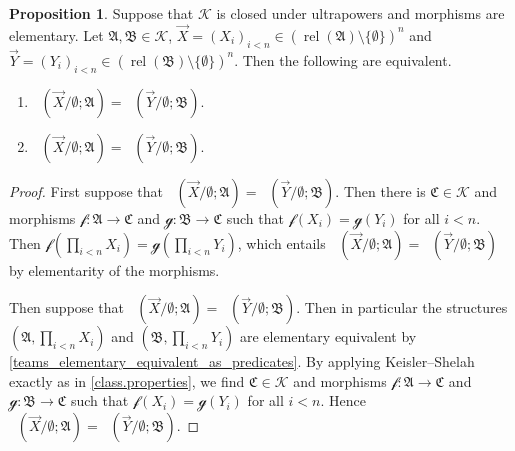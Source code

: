\documentclass[a4paper]{amsart}
\theoremstyle{definition}
\newtheorem{proposition}[definition]{Proposition}
\theoremstyle{remark}
\newcommand{\A}{\mathcal{A}}
\newcommand{\B}{\mathcal{B}}
\newcommand{\C}{\mathcal{C}}
\newcommand\fot{\mathsf{FOT}}
\DeclareMathOperator{\rel}{rel}
\newcommand{\K}{\mathcal{K}}
\theoremstyle{definition}
\renewcommand{\A}{\mathfrak{A}}
\renewcommand{\B}{\mathfrak{B}}
\renewcommand{\C}{\mathfrak{C}}
\DeclareMathOperator{\gtype}{tp_g}
\DeclareMathOperator{\fottype}{tp_\fot}
\newcommand{\f}{\mathcal{f}}
\newcommand{\g}{\mathcal{g}}
\begin{document}
\begin{proposition}\label{galois-types.fot-types}
    Suppose that $\K$ is closed under ultrapowers and morphisms are elementary. Let $\A,\B\in\K$, $\vec X = (X_i)_{i<n}\in(\rel(\A)\setminus\{\emptyset\})^n$ and $\vec Y = (Y_i)_{i<n}\in(\rel(\B)\setminus\{\emptyset\})^n$. Then the following are equivalent.
    \begin{enumerate}
        \item $\gtype(\vec X / \emptyset; \A) = \gtype(\vec Y / \emptyset; \B)$.
        \item $\fottype(\vec X / \emptyset; \A) = \fottype(\vec Y / \emptyset; \B)$.
    \end{enumerate}
\end{proposition}
\begin{proof}
    First suppose that $\gtype(\vec X / \emptyset; \A) = \gtype(\vec Y / \emptyset; \B)$. Then there is $\C\in\K$ and morphisms $\f\colon\A\to\C$ and $\g\colon\B\to\C$ such that $\f(X_i) = \g(Y_i)$ for all $i<n$. Then $\f(\prod_{i<n} X_i) = \g(\prod_{i<n} Y_i)$, which entails $\fottype(\vec X / \emptyset; \A) = \fottype(\vec Y / \emptyset; \B)$ by elementarity of the morphisms.

    Then suppose that $\fottype(\vec X / \emptyset; \A) = \fottype(\vec Y / \emptyset; \B)$. Then in particular the structures $(\A, \prod_{i<n} X_i)$ and $(\B, \prod_{i<n} Y_i)$ are elementary equivalent by \cref{teams_elementary_equivalent_as_predicates}. By applying Keisler--Shelah exactly as in \cref{class.properties}, we find $\C\in\K$ and morphisms $\f\colon\A\to\C$ and $\g\colon\B\to\C$ such that $\f(X_i)=\g(Y_i)$ for all $i<n$. Hence $\gtype(\vec X / \emptyset; \A) = \gtype(\vec Y / \emptyset; \B)$.
\end{proof}
\end{document}
